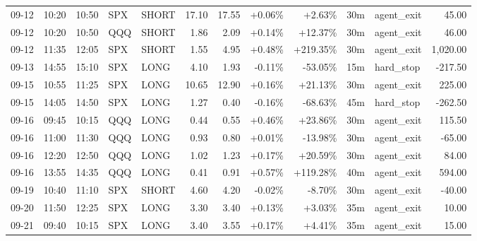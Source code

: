 \documentclass[11pt,a4paper,twoside]{article}
\begin{document}
\begin{center}
\begin{longtable}{>{\color{txtmain}}l l l l l r r r r r >{\color{txtmain}}l r}
09-12 & 10:20 & 10:50 & SPX & SHORT & 17.10 & 17.55 & \textcolor{wingreen}{+0.06\%} & \textcolor{wingreen}{+2.63\%} & 30m & agent\_exit & \textcolor{wingreen}{45.00} \\
09-12 & 10:20 & 10:50 & QQQ & SHORT & 1.86 & 2.09 & \textcolor{wingreen}{+0.14\%} & \textcolor{wingreen}{+12.37\%} & 30m & agent\_exit & \textcolor{wingreen}{46.00} \\
09-12 & 11:35 & 12:05 & SPX & SHORT & 1.55 & 4.95 & \textcolor{wingreen}{+0.48\%} & \textcolor{wingreen}{+219.35\%} & 30m & agent\_exit & \textcolor{wingreen}{1,020.00} \\
09-13 & 14:55 & 15:10 & SPX & LONG & 4.10 & 1.93 & \textcolor{lossred}{-0.11\%} & \textcolor{lossred}{-53.05\%} & 15m & hard\_stop & \textcolor{lossred}{-217.50} \\
09-15 & 10:55 & 11:25 & SPX & LONG & 10.65 & 12.90 & \textcolor{wingreen}{+0.16\%} & \textcolor{wingreen}{+21.13\%} & 30m & agent\_exit & \textcolor{wingreen}{225.00} \\
09-15 & 14:05 & 14:50 & SPX & LONG & 1.27 & 0.40 & \textcolor{lossred}{-0.16\%} & \textcolor{lossred}{-68.63\%} & 45m & hard\_stop & \textcolor{lossred}{-262.50} \\
09-16 & 09:45 & 10:15 & QQQ & LONG & 0.44 & 0.55 & \textcolor{wingreen}{+0.46\%} & \textcolor{wingreen}{+23.86\%} & 30m & agent\_exit & \textcolor{wingreen}{115.50} \\
09-16 & 11:00 & 11:30 & QQQ & LONG & 0.93 & 0.80 & \textcolor{wingreen}{+0.01\%} & \textcolor{lossred}{-13.98\%} & 30m & agent\_exit & \textcolor{lossred}{-65.00} \\
09-16 & 12:20 & 12:50 & QQQ & LONG & 1.02 & 1.23 & \textcolor{wingreen}{+0.17\%} & \textcolor{wingreen}{+20.59\%} & 30m & agent\_exit & \textcolor{wingreen}{84.00} \\
09-16 & 13:55 & 14:35 & QQQ & LONG & 0.41 & 0.91 & \textcolor{wingreen}{+0.57\%} & \textcolor{wingreen}{+119.28\%} & 40m & agent\_exit & \textcolor{wingreen}{594.00} \\
09-19 & 10:40 & 11:10 & SPX & SHORT & 4.60 & 4.20 & \textcolor{lossred}{-0.02\%} & \textcolor{lossred}{-8.70\%} & 30m & agent\_exit & \textcolor{lossred}{-40.00} \\
09-20 & 11:50 & 12:25 & SPX & LONG & 3.30 & 3.40 & \textcolor{wingreen}{+0.13\%} & \textcolor{wingreen}{+3.03\%} & 35m & agent\_exit & \textcolor{wingreen}{10.00} \\
09-21 & 09:40 & 10:15 & SPX & LONG & 3.40 & 3.55 & \textcolor{wingreen}{+0.17\%} & \textcolor{wingreen}{+4.41\%} & 35m & agent\_exit & \textcolor{wingreen}{15.00} \\

\end{longtable}
\end{center}
\end{document}
